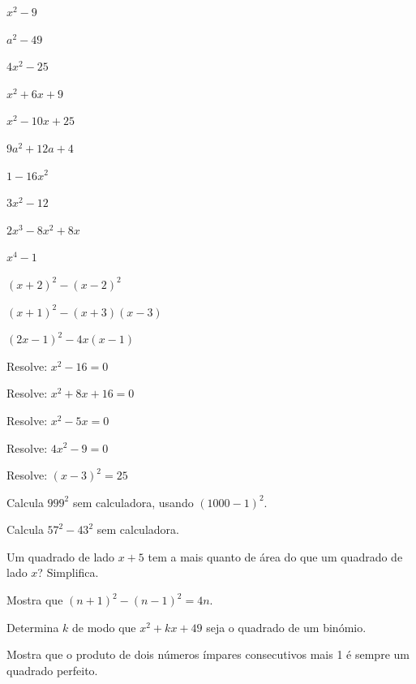 \documentclass[12pt]{article}
\begin{document}
\begin{exercicios}
  \item $x^2 - 9$
  \item $a^2 - 49$
  \item $4x^2 - 25$
  \item $x^2 + 6x + 9$
  \item $x^2 - 10x + 25$
  \item $9a^2 + 12a + 4$
  \item $1 - 16x^2$
  \item $3x^2 - 12$
  \item $2x^3 - 8x^2 + 8x$
  \item $x^4 - 1$
\end{exercicios}

\begin{exercicios}
  \item $(x + 2)^2 - (x - 2)^2$
  \item $(x + 1)^2 - (x + 3)(x - 3)$
  \item $(2x - 1)^2 - 4x(x - 1)$
  \item Resolve: $x^2 - 16 = 0$
  \item Resolve: $x^2 + 8x + 16 = 0$
  \item Resolve: $x^2 - 5x = 0$
  \item Resolve: $4x^2 - 9 = 0$
  \item Resolve: $(x - 3)^2 = 25$
\end{exercicios}

\begin{exercicios}
  \item Calcula $999^2$ sem calculadora, usando $(1000 - 1)^2$.
  \item Calcula $57^2 - 43^2$ sem calculadora.
  \item Um quadrado de lado $x + 5$ tem a mais quanto de área do que um quadrado de lado $x$? Simplifica.
  \item Mostra que $(n + 1)^2 - (n - 1)^2 = 4n$.
  \item Determina $k$ de modo que $x^2 + kx + 49$ seja o quadrado de um binómio.
  \item Mostra que o produto de dois números ímpares consecutivos mais 1 é sempre um quadrado perfeito.
\end{exercicios}
\end{document}

